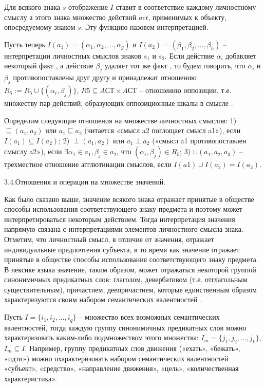 Для всякого знака $s$ отображение $I$ ставит в соответствие каждому личностному смыслу $а$ этого знака множество действий $act$, применимых к объекту, опосредуемому знаком $s$. Эту функцию назовем интерпретацией.

Пусть теперь $I(a_1)=(\alpha_1,\alpha_2,\dots,\alpha_g)$ и $I(a_2)=(\beta_1,\beta_2,\dots,\beta_h)$ – интерпретации личностных смыслов знаков $s_1$ и $s_2$. Если действие $\alpha_i$ добавляет некоторый факт \cite{Osipov2000}, а действие $\beta_j$ удаляет тот же факт \cite{Osipov2000}, то будем говорить, что $\alpha_i$ и $\beta_j$ противопоставлены друг другу и принадлежат отношению $R_5:=R_5\cup\{(\alpha_i,\beta_j)\}$, $R5\subseteq AСТ\times AСТ$ – отношению оппозиции, т.е. множеству пар действий, образующих оппозиционные шкалы в смысле \cite{Kelly1991}.

Определим следующие отношения на множестве личностных смыслов:
1) $\sqsubseteq(a_1,a_2)$ или $a_1\sqsubseteq a_2$ (читается «смысл a2 поглощает смысл a1»), если $I(a_1)\subseteq I(a_2)$;
2) $\perp(a_1,a_2)$  или $a_1\perp a_2$ («смысл a1 противопоставлен смыслу a2»), если $\exists\alpha_1\in a_1,\beta_j\in a_2$, что $(\alpha_i,\beta_j)\in R_5$;
3) $\sqcup(a_1,a_2,a_3)$ – трехместное отношение агглютинации смыслов, если $I(a1)\cup I(a_2)=I(a_3)$.

3.4.Отношения и операции на множестве значений. 

Как было сказано выше, значение всякого знака отражает принятые в обществе способы использования соответствующего знаку предмета и поэтому может интерпретироваться некоторым действием. Тогда интерпретация значения напрямую связана с интерпретациями элементов личностного смысла знака.
Отметим, что личностный смысл, в отличие от значения, отражает индивидуальные предпочтения субъекта, в то время как значение отражает принятые в обществе способы использования соответствующего знаку предмета. В лексике языка значение, таким образом, может отражаться некоторой группой синонимичных предикатных слов: глаголом, девербативом (т.е. отглагольным существительным), причастием, деепричастием, которые единственным образом характеризуются своим набором семантических валентностей \cite{Schank1972}.

Пусть $I=\{i_1,i_2,\dots,i_q\}$ – множество всех возможных семантических валентностей, тогда каждую группу синонимичных предикатных слов можно характеризовать каким-либо подмножеством этого множества: $I_m=\{j_1,j_2,\dots,j_k\}$, $I_m\subseteq I$. Например, группу предикатных слов движения («ехать», «бежать», «идти») можно охарактеризовать набором семантических валентностей «субъект», «средство», «направление движения», «цель», «количественная характеристика». 

